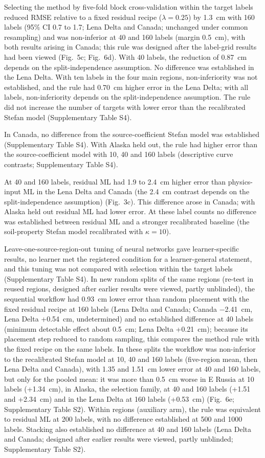 Selecting the method by five-fold block cross-validation within the target labels reduced RMSE relative to a fixed residual recipe ($\lambda = 0.25$) by 1.3~cm with 160 labels (95\% CI 0.7 to 1.7; Lena Delta and Canada; unchanged under common resampling) and was non-inferior at 40 and 160 labels (margin 0.5~cm), with both results arising in Canada; this rule was designed after the label-grid results had been viewed (Fig.~5c; Fig.~6d).
With 40 labels, the reduction of 0.87~cm depends on the split-independence assumption.
No difference was established in the Lena Delta.
With ten labels in the four main regions, non-inferiority was not established, and the rule had 0.70~cm higher error in the Lena Delta; with all labels, non-inferiority depends on the split-independence assumption.
The rule did not increase the number of targets with lower error than the recalibrated Stefan model (Supplementary Table S4).

In Canada, no difference from the source-coefficient Stefan model was established (Supplementary Table S4).
With Alaska held out, the rule had higher error than the source-coefficient model with 10, 40 and 160 labels (descriptive curve contrasts; Supplementary Table S4).

At 40 and 160 labels, residual ML had 1.9 to 2.4~cm higher error than physics-input ML in the Lena Delta and Canada (the 2.4~cm contrast depends on the split-independence assumption) (Fig.~3c).
This difference arose in Canada; with Alaska held out residual ML had lower error.
At these label counts no difference was established between residual ML and a stronger recalibrated baseline (the soil-property Stefan model recalibrated with $\kappa = 10$).

Leave-one-source-region-out tuning of neural networks gave learner-specific results, no learner met the registered condition for a learner-general statement, and this tuning was not compared with selection within the target labels (Supplementary Table S4).
In new random splits of the same regions (re-test in reused regions, designed after earlier results were viewed, partly unblinded), the sequential workflow had 0.93~cm lower error than random placement with the fixed residual recipe at 160 labels (Lena Delta and Canada; Canada −2.41~cm, Lena Delta +0.54~cm, undetermined) and no established difference at 40 labels (minimum detectable effect about 0.5~cm; Lena Delta +0.21~cm); because its placement step reduced to random sampling, this compares the method rule with the fixed recipe on the same labels.
In these splits the workflow was non-inferior to the recalibrated Stefan model at 10, 40 and 160 labels (five-region mean, then Lena Delta and Canada), with 1.35 and 1.51~cm lower error at 40 and 160 labels, but only for the pooled mean: it was more than 0.5~cm worse in E Russia at 10 labels (+1.34~cm), in Alaska, the selection family, at 40 and 160 labels (+1.51 and +2.34~cm) and in the Lena Delta at 160 labels (+0.53~cm) (Fig.~6e; Supplementary Table S2).
Within regions (auxiliary arm), the rule was equivalent to residual ML at 200 labels, with no difference established at 500 and 1000 labels.
Stacking also established no difference at 40 and 160 labels (Lena Delta and Canada; designed after earlier results were viewed, partly unblinded; Supplementary Table S2).
